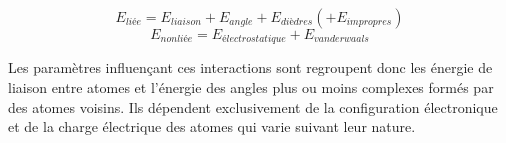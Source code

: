 $$E_{liée} = E_{liaison} + E_{angle} + E_{dièdres} (+ E_{impropres})$$
$$E_{nonliée} = E_{électrostatique} + E_{vanderwaals}$$

Les paramètres influençant ces interactions sont regroupent donc les énergie de liaison entre atomes et l'énergie des angles plus ou moins complexes formés par des atomes voisins. Ils dépendent exclusivement de la configuration électronique et de la charge électrique des atomes qui varie suivant leur nature.




